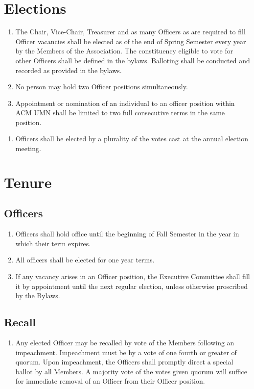 \section{Elections}
\begin{enumerate}
	\item The Chair, Vice-Chair, Treasurer and as many Officers as are required to fill Officer vacancies shall be elected as of the end of Spring Semester every year by the Members of the Association. The constituency eligible to vote for other Officers shall be defined in the bylaws. Balloting shall be conducted and recorded as provided in the bylaws.
	\item No person may hold two Officer positions simultaneously.
	\item Appointment or nomination of an individual to an officer position within ACM UMN shall be limited to two full consecutive terms in the same position.
\end{enumerate}

\begin{enumerate}
	\item Officers shall be elected by a plurality of the votes cast at the annual election meeting.
\end{enumerate}

\section{Tenure}

\subsection{Officers}
\begin{enumerate}
	\item Officers shall hold office until the beginning of Fall Semester in the year in which their term expires.
	\item All officers shall be elected for one year terms.
	\item If any vacancy arises in an Officer position, the Executive Committee shall fill it by appointment until the next regular election, unless otherwise proscribed by the Bylaws.
\end{enumerate}

\subsection{Recall}
\begin{enumerate}
	\item Any elected Officer may be recalled by vote of the Members following an impeachment. Impeachment must be by a vote of one fourth or greater of quorum. Upon impeachment, the Officers shall promptly direct a special ballot by all Members. A majority vote of the votes given quorum will suffice for immediate removal of an Officer from their Officer position.
\end{enumerate}

